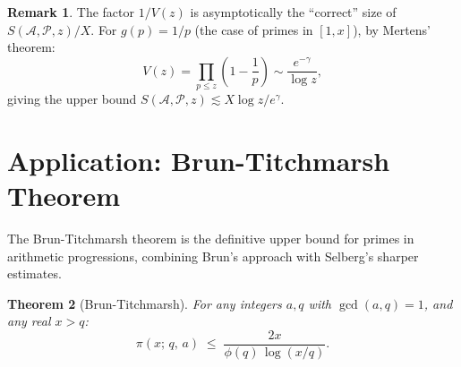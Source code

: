 \documentclass[12pt,a4paper]{amsart}
\newtheorem{theorem}{Theorem}[section]
\theoremstyle{definition}
\newtheorem{remark}[theorem]{Remark}
\begin{document}
\begin{remark}
  The factor $1/V(z)$ is asymptotically the ``correct'' size of
  $S(\mathcal{A},\mathcal{P},z)/X$.  For $g(p) = 1/p$ (the case of
  primes in $[1,x]$), by Mertens' theorem:
  \[
    V(z) = \prod_{p \leq z} \left(1 - \frac{1}{p}\right) \sim \frac{e^{-\gamma}}{\log z},
  \]
  giving the upper bound $S(\mathcal{A},\mathcal{P},z) \lesssim X \log z / e^{\gamma}$.
\end{remark}

\section{Application: Brun-Titchmarsh Theorem}
\label{sec:brun_titchmarsh}

The Brun-Titchmarsh theorem is the definitive upper bound for primes in
arithmetic progressions, combining Brun's approach with Selberg's sharper estimates.

\begin{theorem}[Brun-Titchmarsh]\label{thm:brun_titchmarsh}
  For any integers $a, q$ with $\gcd(a,q) = 1$, and any real $x > q$:
  \[
    \pi(x;\,q,\,a)
    \;\leq\; \frac{2x}{\phi(q)\,\log(x/q)}.
  \]
\end{theorem}
\end{document}

